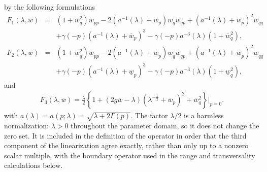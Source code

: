 \documentclass[11pt,reqno]{amsart}
\numberwithin{equation}{section}
\theoremstyle{definition}
\theoremstyle{remark}
\begin{document}
by the following formulations
\begin{eqnarray}
F_1(\lambda,\overline{w})&=&\left(1+\overline{w}_q^2\right)\overline{w}_{pp}-2(a^{-1}(\lambda)+\overline{w}_p)\overline{w}_q\overline{w}_{qp}+\left(a^{-1}(\lambda)+\overline{w}_p\right)^2\overline{w}_{qq}\nonumber\\
&~&+\gamma(-p)\left(a^{-1}(\lambda)+\overline{w}_p\right)^3-\gamma(-p)a^{-3}(\lambda)(1+\overline{w}_q^2),\label{eq4.3}
\end{eqnarray}
\begin{eqnarray}
F_2(\lambda,\underline{w})&=&\left(1+\underline{w}_q^2\right)\underline{w}_{pp}-2(a^{-1}(\lambda)+\underline{w}_p)\underline{w}_q\underline{w}_{qp}+\left(a^{-1}(\lambda)+\underline{w}_p\right)^2\underline{w}_{qq}\nonumber\\
&~&+\gamma(-p)\left(a^{-1}(\lambda)+\underline{w}_p\right)^3
-\gamma(-p)a^{-3}(\lambda)(1+\underline{w}_q^2),\label{eq4.4}
\end{eqnarray}
and
\begin{eqnarray}
F_3(\lambda,\overline{w})=\frac{\lambda}{2}
\left\{1+(2g\overline{w}-\lambda)
\left(\lambda^{-\frac{1}{2}}+\overline{w}_p\right)^2
+\overline{w}_q^2\right\}\Big|_{p=0}.
\label{eq4.5}
\end{eqnarray}
with $a(\lambda)=a(p;\lambda)=\sqrt{\lambda+2\Gamma(p)}$.
The factor $\lambda/2$ is a harmless normalization: $\lambda>0$
throughout the parameter domain, so it does not change the zero set.
It is included in the definition of the operator in order that the
third component of the linearization agree exactly, rather than only
up to a nonzero scalar multiple, with the boundary operator used in
the range and transversality calculations below.
\end{document}
